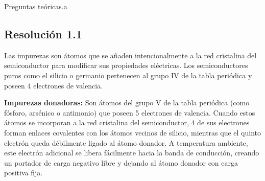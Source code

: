 \documentclass[
  11pt,
  letterpaper,
   addpoints,
   answers
  ]{exam}
\begin{document}
\begin{questions}
    \question Preguntas teóricas.a

\begin{solution}
\subsection*{Resolución 1.1}
Las impurezas son átomos que se añaden intencionalmente a la red cristalina del semiconductor para modificar sus propiedades eléctricas. Los semiconductores puros como el silicio o germanio pertenecen al grupo IV de la tabla periódica y poseen 4 electrones de valencia.

\textbf{Impurezas donadoras:} Son átomos del grupo V de la tabla periódica (como fósforo, arsénico o antimonio) que poseen 5 electrones de valencia. Cuando estos átomos se incorporan a la red cristalina del semiconductor, 4 de sus electrones forman enlaces covalentes con los átomos vecinos de silicio, mientras que el quinto electrón queda débilmente ligado al átomo donador. A temperatura ambiente, este electrón adicional se libera fácilmente hacia la banda de conducción, creando un portador de carga negativo libre y dejando al átomo donador con carga positiva fija.


\end{solution}
\end{questions}
\end{document}
